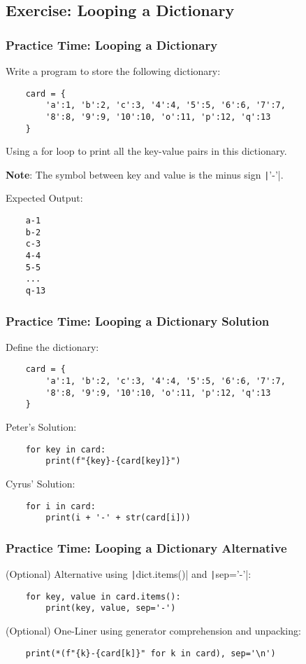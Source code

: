 \documentclass{beamer}
\begin{document}
\subsection{Exercise: Looping a Dictionary}
\begin{frame}[fragile]
    \frametitle{Practice Time: Looping a Dictionary}
    Write a program to store the following dictionary:
    \begin{verbatim}
    card = {
        'a':1, 'b':2, 'c':3, '4':4, '5':5, '6':6, '7':7,
        '8':8, '9':9, '10':10, 'o':11, 'p':12, 'q':13
    }
    \end{verbatim}
    Using a for loop to print all the key-value pairs in this dictionary.

    \textbf{Note}: The symbol between key and value is the minus sign \texttt|'-'|.

    Expected Output:
    \begin{verbatim}
    a-1
    b-2
    c-3
    4-4
    5-5
    ...
    q-13
    \end{verbatim}
\end{frame}
\begin{frame}[fragile]
    \frametitle{Practice Time: Looping a Dictionary Solution}

    Define the dictionary:
    \begin{verbatim}
    card = {
        'a':1, 'b':2, 'c':3, '4':4, '5':5, '6':6, '7':7,
        '8':8, '9':9, '10':10, 'o':11, 'p':12, 'q':13
    }
    \end{verbatim}

    Peter's Solution:
    \begin{verbatim}
    for key in card:
        print(f"{key}-{card[key]}")
    \end{verbatim}

    Cyrus' Solution:
    \begin{verbatim}
    for i in card:
        print(i + '-' + str(card[i]))
    \end{verbatim}
\end{frame}

\begin{frame}[fragile]
    \frametitle{Practice Time: Looping a Dictionary Alternative}
    (Optional) Alternative using \texttt|dict.items()| and \texttt|sep='-'|:
    \begin{verbatim}
    for key, value in card.items():
        print(key, value, sep='-')
    \end{verbatim}

    (Optional) One-Liner using generator comprehension and unpacking:
    \begin{verbatim}
    print(*(f"{k}-{card[k]}" for k in card), sep='\n')
    \end{verbatim}
\end{frame}
\end{document}
